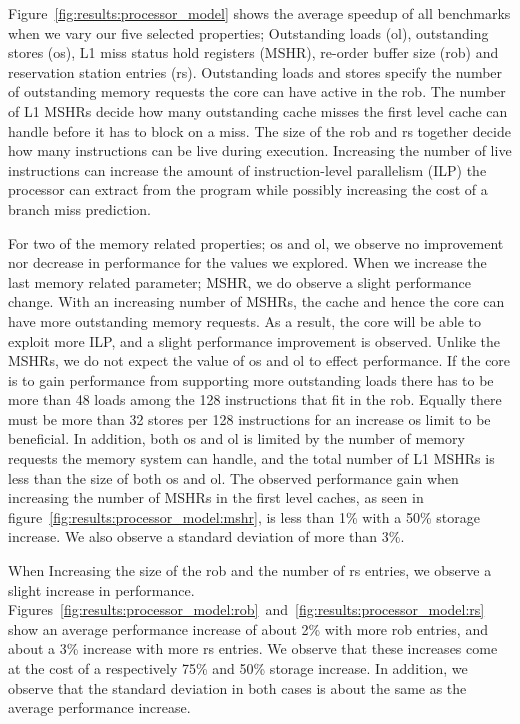 Figure~\ref{fig:results:processor_model} shows the average speedup of all benchmarks when we vary our five selected properties; Outstanding loads (ol), outstanding stores (os), L1 miss status hold registers (MSHR), re-order buffer size (rob) and reservation station entries (rs).
Outstanding loads and stores specify the number of outstanding memory requests the core can have active in the rob.
The number of L1 MSHRs decide how many outstanding cache misses the first level cache can handle before it has to block on a miss.
The size of the rob and rs together decide how many instructions can be live during execution.  
Increasing the number of live instructions can increase the amount of instruction-level parallelism (ILP) the processor can extract from the program while possibly increasing the cost of a branch miss prediction.

For two of the memory related properties; os and ol, we observe no improvement nor decrease in performance for the values we explored.
When we increase the last memory related parameter; MSHR, we do observe a slight performance change.
With an increasing number of MSHRs, the cache and hence the core can have more outstanding memory requests. 
As a result, the core will be able to exploit more ILP, and a slight performance improvement is observed. 
Unlike the MSHRs, we do not expect the value of os and ol to effect performance. 
If the core is to gain performance from supporting more outstanding loads there has to be more than 48 loads among the 128 instructions that fit in the rob. 
Equally there must be more than 32 stores per 128 instructions for an increase os limit to be beneficial.
In addition, both os and ol is limited by the number of memory requests the memory system can handle, and the total number of L1 MSHRs is less than the size of both os and ol.
The observed performance gain when increasing the number of MSHRs in the first level caches, as seen in figure~\ref{fig:results:processor_model:mshr}, is less than 1\% with a 50\% storage increase. 
We also observe a standard deviation of more than 3\%. 

When Increasing the size of the rob and the number of rs entries, we observe a slight increase in performance.
Figures~\ref{fig:results:processor_model:rob}~and~\ref{fig:results:processor_model:rs} show an average performance increase of about 2\% with more rob entries, and about a 3\% increase with more rs entries.
We observe that these increases come at the cost of a respectively 75\% and 50\% storage increase.
In addition, we observe that the standard deviation in both cases is about the same as the average performance increase.

